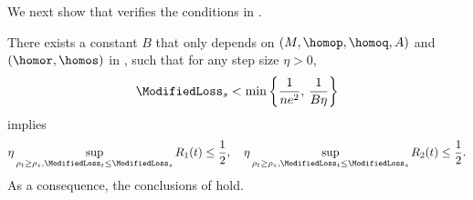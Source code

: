 We next show that  verifies the conditions in .

\begin{lemma}\label{residual_estimates}
    There exists a constant $B$ that only depends on $(M, \homop, \homoq, A)$ and $(\homor, \homos)$ in , such that for any step size $\eta > 0$,
    \begin{equation*}
        \ModifiedLoss_s < \min \left\{ \frac{1}{n e^2}, \, \frac{1}{B \eta} \right\}
    \end{equation*}
    implies
    \begin{equation*}
        \eta \sup_{\rho_t \ge \rho_s, \ModifiedLoss_t \le \ModifiedLoss_s} R_1 (t) \le \frac{1}{2}, \quad \eta \sup_{\rho_t \ge \rho_s, \ModifiedLoss_t \le \ModifiedLoss_s} R_2 (t)  \le \frac{1}{2}.
    \end{equation*}
    As a consequence, the conclusions of  hold.
\end{lemma}

